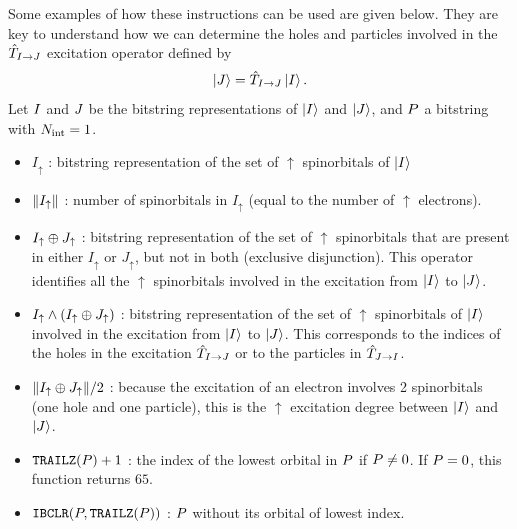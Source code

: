 \documentclass[./thesis.tex]{subfiles}
\begin{document}
Some examples of how these instructions can be used are given below. They are key to understand how we can determine the holes and particles involved in the ${\hat{T}_{I \rightarrow J}}$ excitation operator defined by
\begin{equation}
\label{eq:ordering_removed}
\ket{J} = {\hat{T}_{I \rightarrow J}} \ket{I}.
\end{equation}
Let ${{{I}}}$ and ${{{J}}}$ be the bitstring representations of $\ket{I}$ and $\ket{J}$, and ${{P}}$ a bitstring with ${N_\text{int}}=1$. 


\begin{itemize}
	      
	\item $I_{\uparrow}$ : bitstring representation of the set of $\uparrow$ spinorbitals of $\ket{I}$
	            
	\item $\norm{I_{\uparrow}}$ : number of spinorbitals in $I_{\uparrow}$ (equal to the number of $\uparrow$ electrons).
	            
	\item $I_{\uparrow} \oplus J_{\uparrow}$ : bitstring representation of the set of $\uparrow$ spinorbitals that are present in either $I_{\uparrow}$ or $J_{\uparrow}$, but not in both (exclusive disjunction).
        This operator identifies all the $\uparrow$ spinorbitals involved in the excitation from $\ket{I}$ to $\ket{J}$. 
	            
	\item $I_{\uparrow} \wedge \qty(I_{\uparrow} \oplus J_{\uparrow})$ : 
        bitstring representation of the set of $\uparrow$ spinorbitals of $\ket{I}$ involved in the excitation from $\ket{I}$ to $\ket{J}$. This corresponds to the indices of the holes in the excitation ${\hat{T}_{I \rightarrow J}}$ or to the particles in ${\hat{T}_{J \rightarrow I}}$. 
	            
	\item $\norm{I_{\uparrow} \oplus J_{\uparrow}}/2$ : because the excitation of an electron involves 2 spinorbitals (one hole and one particle), this is the $\uparrow$ excitation degree between $\ket{I}$ and $\ket{J}$.
	            
	\item $\text{\texttt{TRAILZ}}({{P}})+1$ : the index of the lowest orbital in ${{P}}$ if ${{P}} \ne 0$. If ${{P}} = 0$, this function returns $65$.
	            
	\item $\text{\texttt{IBCLR}}({{P}},\text{\texttt{TRAILZ}}({{P}}))$ : ${{P}}$ without its orbital of lowest index.

\end{itemize}
\end{document}
